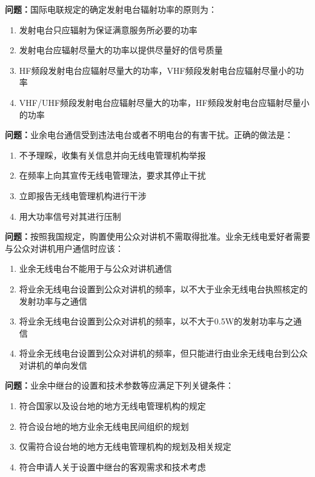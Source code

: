 \bigskip


\noindent\textbf{问题：}国际电联规定的确定发射电台辐射功率的原则为：
\begin{enumerate}[label=\Alph*), leftmargin=3em]
\item 发射电台只应辐射为保证满意服务所必要的功率
\item 发射电台应辐射尽量大的功率以提供尽量好的信号质量
\item HF频段发射电台应辐射尽量大的功率，VHF频段发射电台应辐射尽量小的功率
\item VHF/UHF频段发射电台应辐射尽量大的功率，HF频段发射电台应辐射尽量小的功率
\end{enumerate}

\bigskip


\noindent\textbf{问题：}业余电台通信受到违法电台或者不明电台的有害干扰。正确的做法是：
\begin{enumerate}[label=\Alph*), leftmargin=3em]
\item 不予理睬，收集有关信息并向无线电管理机构举报
\item 在频率上向其宣传无线电管理法，要求其停止干扰
\item 立即报告无线电管理机构进行干涉
\item 用大功率信号对其进行压制
\end{enumerate}

\bigskip


\noindent\textbf{问题：}按照我国规定，购置使用公众对讲机不需取得批准。业余无线电爱好者需要与公众对讲机用户通信时应该：
\begin{enumerate}[label=\Alph*), leftmargin=3em]
\item 业余无线电台不能用于与公众对讲机通信
\item 将业余无线电台设置到公众对讲机的频率，以不大于业余无线电台执照核定的发射功率与之通信
\item 将业余无线电台设置到公众对讲机的频率，以不大于0.5W的发射功率与之通信
\item 将业余无线电台设置到公众对讲机的频率，但只能进行由业余无线电台到公众对讲机的单向发信
\end{enumerate}

\bigskip


\noindent\textbf{问题：}业余中继台的设置和技术参数等应满足下列关键条件：
\begin{enumerate}[label=\Alph*), leftmargin=3em]
\item 符合国家以及设台地的地方无线电管理机构的规定
\item 符合设台地的地方业余无线电民间组织的规划
\item 仅需符合设台地的地方无线电管理机构的规划及相关规定
\item 符合申请人关于设置中继台的客观需求和技术考虑
\end{enumerate}

